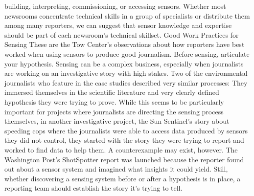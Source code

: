 \begin{itemize}
building, interpreting, commissioning, or accessing sensors. Whether most
newsrooms concentrate technical skills in a group of specialists or distribute
them among many reporters, we can suggest that sensor knowledge and
expertise should be part of each newsroom's technical skillset.
Good Work Practices for Sensing
These are the Tow Center's observations about how reporters have best
worked when using sensors to produce good journalism.
Before sensing, articulate your hypothesis.
Sensing can be a complex business, especially when journalists are working
on an investigative story with high stakes. Two of the environmental journalists
who feature in the case studies described very similar processes: They
immersed themselves in the scientific literature and very clearly defined
hypothesis they were trying to prove. While this seems to be particularly
important for projects where journalists are directing the sensing process
themselves, in another investigative project, the Sun Sentinel's story about
speeding cops where the journalists were able to access data produced by
sensors they did not control, they started with the story they were trying to
report and worked to find data to help them.
A counterexample may exist, however. The Washington Post's ShotSpotter
report was launched because the reporter found out about a sensor system
and imagined what insights it could yield. Still, whether discovering a sensing
system before or after a hypothesis is in place, a reporting team should
establish the story it's trying to tell.


\end{itemize}
